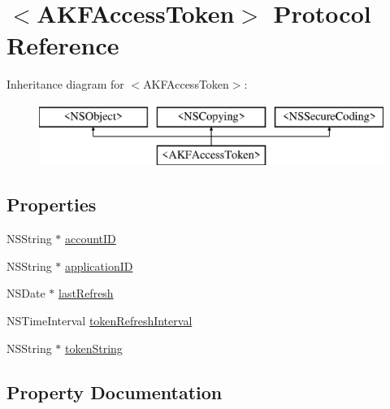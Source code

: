 \hypertarget{protocol_a_k_f_access_token-p}{}\section{$<$A\+K\+F\+Access\+Token$>$ Protocol Reference}
\label{protocol_a_k_f_access_token-p}
Inheritance diagram for $<$A\+K\+F\+Access\+Token$>$\+:\begin{figure}[H]
\begin{center}
\leavevmode
\includegraphics[height=2.000000cm]{protocol_a_k_f_access_token-p}
\end{center}
\end{figure}
\subsection*{Properties}
\begin{DoxyCompactItemize}
\item 
N\+S\+String $\ast$ \hyperlink{protocol_a_k_f_access_token-p_aa429dd592beacda21fe207a2392c3150}{account\+I\+D}
\item 
N\+S\+String $\ast$ \hyperlink{protocol_a_k_f_access_token-p_a04cf0512105871b5c92d2f326930041b}{application\+I\+D}
\item 
N\+S\+Date $\ast$ \hyperlink{protocol_a_k_f_access_token-p_a901024f76d3beb07dfce0b871dde60e8}{last\+Refresh}
\item 
N\+S\+Time\+Interval \hyperlink{protocol_a_k_f_access_token-p_a7200387e19b2a491943aaa905be51c08}{token\+Refresh\+Interval}
\item 
N\+S\+String $\ast$ \hyperlink{protocol_a_k_f_access_token-p_a5fd03e48f3df5c786cd971df95fb3c95}{token\+String}
\end{DoxyCompactItemize}


\subsection{Property Documentation}
\hypertarget{protocol_a_k_f_access_token-p_aa429dd592beacda21fe207a2392c3150}{}
